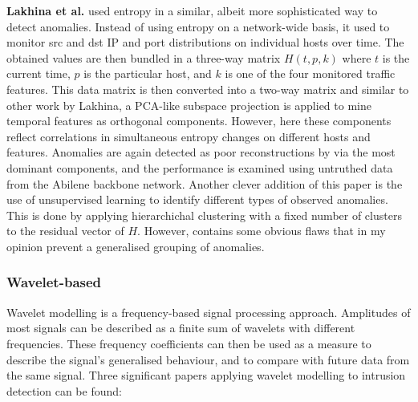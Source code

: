 \documentclass[a4paper,12pt,twoside]{report}
\begin{document}
\textbf{Lakhina et al.} \cite{lakhina2005mining} used entropy in a similar, albeit more sophisticated way to detect anomalies. Instead of using entropy on a network-wide basis, it used to monitor src and dst IP and port distributions on individual hosts over time. The obtained values are then bundled in a three-way matrix $H(t,p,k)$ where $t$ is the current time, $p$ is the particular host, and $k$ is one of the four monitored traffic features. This data matrix is then converted into a two-way matrix and similar to other work by Lakhina, a PCA-like subspace projection is applied to mine temporal features as orthogonal components. However, here these components reflect correlations in simultaneous entropy changes on different hosts and features. Anomalies are again detected as poor reconstructions by via the most dominant components, and the performance is examined using untruthed data from the Abilene backbone network. Another clever addition of this paper is the use of unsupervised learning to identify different types of observed anomalies. This is done by applying hierarchichal clustering with a fixed number of clusters to the residual vector of $H$. However, contains some obvious flaws that in my opinion prevent a generalised grouping of anomalies.


\subsubsection{Wavelet-based}

Wavelet modelling is a frequency-based signal processing approach. Amplitudes of most signals can be described as a finite sum of wavelets with different frequencies. These frequency coefficients can then be used as a measure to describe the signal's generalised behaviour, and to compare with future data from the same signal. Three significant papers applying wavelet modelling to intrusion detection can be found:

\end{document}
